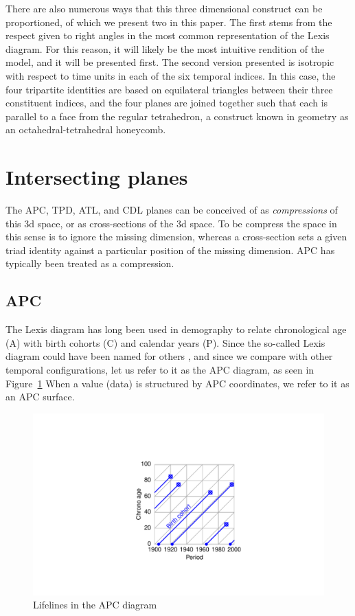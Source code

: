 \documentclass[11pt,oneside]{article} %
\newcommand\eg[1]{\textcolor{bl}{#1}}
\begin{document}
There are also
numerous ways that this three dimensional construct can be proportioned, of
which we present two in this paper. The first stems from the respect given to
right angles in the most common representation of the Lexis diagram. For this reason, it will likely be
the most intuitive rendition of the model, and it will be presented first. The
second version presented is isotropic with respect to time units in each of the
six temporal indices. In this case, the four tripartite identities are based on
equilateral triangles between their three constituent indices, and the four
planes are joined together such that each is parallel to a face from the regular
tetrahedron, a construct known in geometry as an octahedral-tetrahedral
honeycomb.

\section*{Intersecting planes}

The \eg{APC}, \eg{TPD}, \eg{ATL}, and \eg{CDL} planes can be conceived of as
\textit{compressions} of this 3d space, or as cross-sections of the 3d space. To
be compress the space in this sense is to ignore the missing dimension,
whereas a cross-section sets a given triad identity against a particular
position of the missing dimension. \eg{APC} has typically been treated as a
compression. 


\subsection*{APC}
The Lexis diagram has long been used in demography to relate chronological age
(A) with birth cohorts (C) and calendar years (P). Since the so-called Lexis
diagram could have been named for others
\citep{vandeschrick2001lexis,keiding2011age}, and since we compare with other
temporal configurations, let us refer to it as the APC diagram, as seen in
Figure~\ref{APCright}
When a value (data) is structured by APC coordinates, we refer to it as an APC surface.

\begin{figure}[b!]
    \centering
    \includegraphics[scale=.7]{Figures/LabPres/APC2.pdf}
    \caption{Lifelines in the APC diagram}
    \label{APCright}
\end{figure} 
\end{document}
